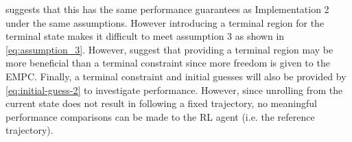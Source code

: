 \cite{amritEconomicOptimizationUsing2011} suggests that this has the same performance guarantees as Implementation 2 under the same assumptions. However introducing a terminal region for the terminal state makes it difficult to meet assumption 3 as shown in \autoref{eq:assumption_3}. However, \cite{amritEconomicOptimizationUsing2011} suggest that providing a terminal region may be more beneficial than a terminal constraint since more freedom is given to the EMPC. Finally, a terminal constraint and initial guesses will also be provided by \autoref{eq:initial-guess-2} to investigate performance. However, since unrolling from the current state does not result in following a fixed trajectory, no meaningful performance comparisons can be made to the RL agent (i.e. the reference trajectory).



